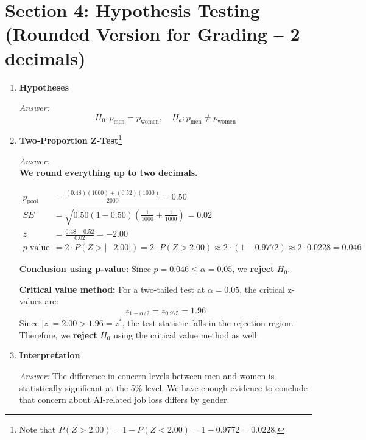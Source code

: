 \documentclass[12pt]{article}
\begin{document}
\newpage
\section*{Section 4: Hypothesis Testing (Rounded Version for Grading -- 2 decimals)}

\begin{enumerate}[label=4.\arabic*]
    \item \textbf{Hypotheses}

    \textit{Answer:}
\[
    H_0: p_{\text{men}} = p_{\text{women}}, \quad H_a: p_{\text{men}} \neq p_{\text{women}}
\]

    \item \textbf{Two-Proportion Z-Test}\text{ }\footnote{Note that $P(Z > 2.00) = 1 - P(Z < 2.00) = 1-0.9772 = 0.0228$.}

    \textit{Answer:} \\
    \textbf{We round everything up to two decimals.}

    \begin{align*}
    p_{\text{pool}} &= \frac{(0.48)(1000) + (0.52)(1000)}{2000} = \boxed{0.50} \\
    SE &= \sqrt{0.50(1 - 0.50)\left(\frac{1}{1000} + \frac{1}{1000}\right)} = \boxed{0.02} \\
    z &= \frac{0.48 - 0.52}{0.02} = \boxed{-2.00} \\
    p\text{-value} &= 2 \cdot P(Z > |{-2.00}|) = 2 \cdot P(Z > 2.00) \approx 2\cdot (1-0.9772) \approx 2 \cdot 0.0228 = \boxed{0.046}
    \end{align*}

    \textbf{Conclusion using p-value:} Since $p = 0.046 \leq \alpha = 0.05$, we \textbf{reject} $H_0$.

    \textbf{Critical value method:} For a two-tailed test at $\alpha = 0.05$, the critical z-values are:
\[
    z_{1-\alpha/2} = z_{0.975} = \boxed{1.96}
\]
    Since $\left| z \right| = 2.00 > 1.96 =z^*$, the test statistic falls in the rejection region. Therefore, we \textbf{reject} $H_0$ using the critical value method as well.

    \item \textbf{Interpretation}

    \textit{Answer:} The difference in concern levels between men and women is statistically significant at the 5\% level. We have enough evidence to conclude that concern about AI-related job loss differs by gender.
\end{enumerate}


\newpage
\end{document}
